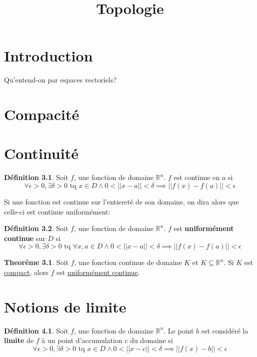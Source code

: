 \documentclass[12pt]{book}
\title{Topologie}
\let\Bbb\mathbb
\theoremstyle{definition}
\newtheorem{definition}{Définition}[section]
\newtheorem{theorem}{Theorême}[section]
\begin{document}
\chapter{Introduction}
Qu'entend-on par espaces vectoriels?

\chapter{Compacité}

\chapter{Continuité}
\begin{definition}
    \label{def:continuite}
    Soit $f$, une fonction de domaine $\Bbb R^n$. $f$ est continue en $a$ si 
    $$\forall \epsilon > 0, \exists \delta > 0 \text{ tq } x \in D \land 0 < ||x - a|| < \delta \implies || f(x) - f(a) || < \epsilon$$
\end{definition}

Si une fonction est continue sur l'entiereté de son domaine, on dira alors que celle-ci est continue uniformément:
\begin{definition}
    \label{def:continuite_uniforme}
    Soit $f$, une fonction de domaine $\Bbb R^n$. $f$ est \textbf{uniformément continue} sur $D$ si 
    $$\forall \epsilon > 0, \exists \delta > 0 \text{ tq } \forall x, a \in D \land 0 < ||x - a|| < \delta \implies || f(x) - f(a) || < \epsilon$$
\end{definition}

\begin{theorem}
    \label{def:compact_implique_continuite_uniforme}
    Soit $f$, une fonction continue de domaine $K$ et $K \subseteq \Bbb R^n$. Si $K$ est \hyperref[def:compacite]{compact}, alors $f$ est 
    \hyperref[def:continuite_uniforme]{uniformément continue}.
\end{theorem}

\chapter{Notions de limite}
\begin{definition}
    \label{def:limite}
    Soit $f$, une fonction de domaine $\Bbb R^n$. Le point $b$ est considéré la \textbf{limite} de $f$ à un point d'accumulation $c$ du domaine si
    $$\forall \epsilon > 0, \exists \delta > 0 \text{ tq } x \in D \land 0 < ||x - c|| < \delta \implies || f(x) - b || < \epsilon$$
\end{definition}
\end{document}

